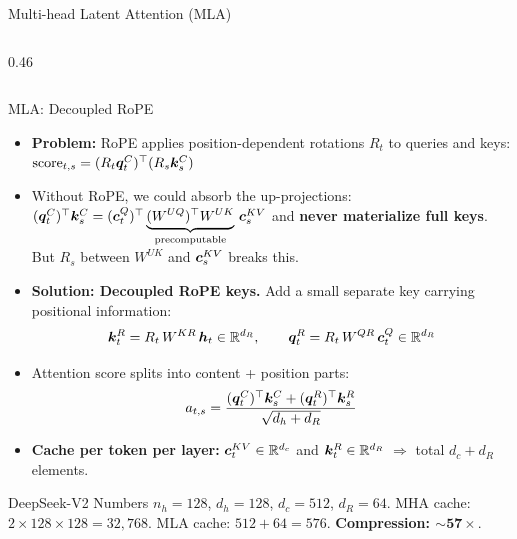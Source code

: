 \begin{frame}{Multi-head Latent Attention (MLA)}
\begin{columns}[T]
\begin{column}{0.46\textwidth}
    \end{column}
  \end{columns}

\end{frame}

\begin{frame}{MLA: Decoupled RoPE}

  \begin{itemize}
    \item \textbf{Problem:} RoPE applies position-dependent rotations $R_t$ to queries and keys:
      $\text{score}_{t,s} = (R_t {\boldsymbol{q}}^C_t)^\top (R_s {\boldsymbol{k}}^C_s)$
    \item Without RoPE, we could absorb the up-projections:
      $({\boldsymbol{q}}^C_t)^\top {\boldsymbol{k}}^C_s = ({\boldsymbol{c}}^Q_t)^\top \underbrace{(W^{UQ})^\top W^{UK}}_{\text{precomputable}}\, {\boldsymbol{c}}^{KV}_s$
      and \textbf{never materialize full keys}.
      But $R_s$ between $W^{UK}$ and ${\boldsymbol{c}}^{KV}_s$ breaks this.
    \item \textbf{Solution: Decoupled RoPE keys.}
      Add a small separate key carrying positional information:
      \[
        {\boldsymbol{k}}^R_t = R_t\, W^{KR}\, {\boldsymbol{h}}_t \in \mathbb{R}^{d_R}, \qquad
        {\boldsymbol{q}}^R_t = R_t\, W^{QR}\, {\boldsymbol{c}}^Q_t \in \mathbb{R}^{d_R}
      \]
    \item Attention score splits into content + position parts:
      \[
        a_{t,s} = \frac{({\boldsymbol{q}}^C_t)^\top {\boldsymbol{k}}^C_s + ({\boldsymbol{q}}^R_t)^\top {\boldsymbol{k}}^R_s}{\sqrt{d_h + d_R}}
      \]
    \item \textbf{Cache per token per layer:} ${\boldsymbol{c}}^{KV}_t \in \mathbb{R}^{d_c}$ and ${\boldsymbol{k}}^R_t \in \mathbb{R}^{d_R}$
      $\Rightarrow$ total $d_c + d_R$ elements.
  \end{itemize}

  \vspace{0.3em}
  \begin{exampleblock}{\small DeepSeek-V2 Numbers}
    $n_h{=}128$, $d_h{=}128$, $d_c{=}512$, $d_R{=}64$.
    MHA cache: $2 \times 128 \times 128 = 32{,}768$.
    MLA cache: $512 + 64 = 576$.
    \textbf{Compression: $\mathbf{\sim 57\times}$}.
  \end{exampleblock}

\end{frame}

